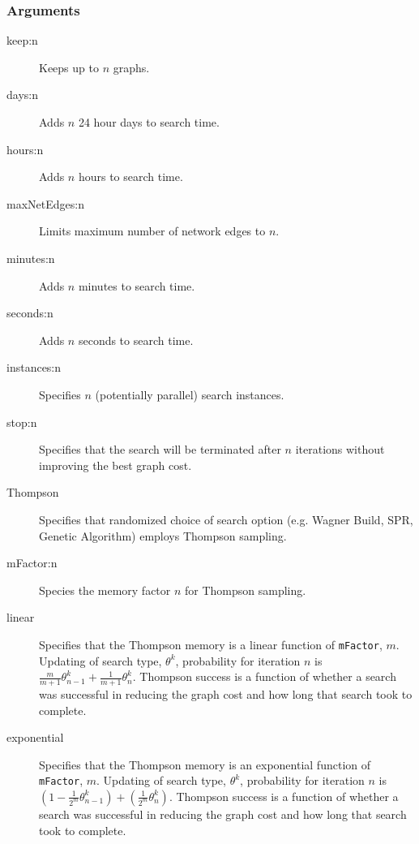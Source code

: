 	\subsubsection{Arguments}
	\begin{description}
		\item[keep:n] Keeps up to $n$ graphs.
		
		\item[days:n] Adds $n$ 24 hour days to search time.
		
		\item[hours:n] Adds $n$ hours to search time.
		
		\item[maxNetEdges:n] Limits maximum number of network edges to $n$.
		
		\item[minutes:n] Adds $n$ minutes to search time.
		
		\item[seconds:n] Adds $n$ seconds to search time.
		
		\item[instances:n] Specifies $n$ (potentially parallel) search instances.
		
		\item[stop:n] Specifies that the search will be terminated after $n$ iterations without improving the best graph cost.
		
		\item[Thompson] Specifies that randomized choice of search option (e.g. Wagner Build, SPR, Genetic Algorithm) 
		employs Thompson sampling.
		
		\item[mFactor:n] Species the memory factor $n$ for Thompson sampling.
		
		\item[linear] Specifies that the Thompson memory is a linear function of \texttt{mFactor}, $m$.  Updating of search type, 
		$\theta^k$, probability for iteration $n$ is $\frac{m}{m+1} \theta^k_{n-1} + \frac{1}{m+1} \theta^k_n$.  Thompson success
		is a function of whether a search was successful in reducing the graph cost and how long that search took to complete.
		
		\item[exponential] Specifies that the Thompson memory is an exponential function of \texttt{mFactor}, $m$.  Updating of search type, 
		$\theta^k$, probability for iteration $n$ is $ \left(1 - \frac{1}{2^m} \theta^k_{n-1}\right) + \left(\frac{1}{2^m} \theta^k_n \right)$.  Thompson success
		is a function of whether a search was successful in reducing the graph cost and how long that search took to complete.
		
	\end{description}
		
